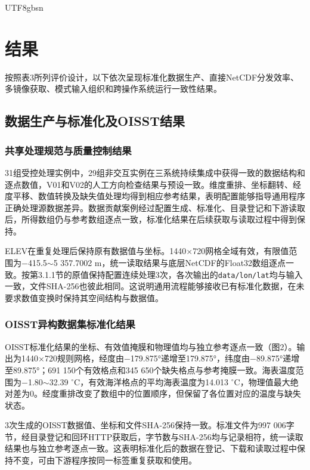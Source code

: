 \documentclass[numdoi]{chinese}
\begin{document}
\begin{CJK}{UTF8}{gbsn}
\section{结果}
按照表3所列评价设计，以下依次呈现标准化数据生产、直接NetCDF分发效率、多镜像获取、模式输入组织和跨操作系统运行一致性结果。

\subsection{数据生产与标准化及OISST结果}
\subsubsection{共享处理规范与质量控制结果}
31组受控处理实例中，29组非交互实例在三系统持续集成中获得一致的数据结构和逐点数值，V01和V02的人工方向检查结果与预设一致。维度重排、坐标翻转、经度平移、数值转换及缺失值处理均得到相应参考结果，表明配置能够指导通用程序正确处理源数据差异。数据贡献案例经过配置生成、标准化、目录登记和下游读取后，所得数组仍与参考数组逐点一致，标准化结果在后续获取与读取过程中得到保持。

ELEV在重复处理后保持原有数据值与坐标。1440\ensuremath{\times}720网格全域有效，有限值范围为\ensuremath{-}415.5\ensuremath{\sim}5 357.7002 m，统一读取结果与底层NetCDF的Float32数组逐点一致。按第3.1.1节的原值保持配置连续处理3次，各次输出的\nolinkurl{data/lon/lat}均与输入一致，文件SHA-256也彼此相同。这说明通用流程能够接收已有标准化数据，在未要求数值变换时保持其空间结构与数据值。

\subsubsection{OISST异构数据集标准化结果}
OISST标准化结果的坐标、有效值掩膜和物理值均与独立参考逐点一致（图2）。输出为1440\ensuremath{\times}720规则网格，经度由\ensuremath{-}179.875°递增至179.875°，纬度由\ensuremath{-}89.875°递增至89.875°；691 150个有效格点和345 650个缺失格点与参考掩膜一致。海表温度范围为\ensuremath{-}1.80\ensuremath{\sim}32.39 \ensuremath{{}^{\circ}\mathrm{C}}，有效海洋格点的平均海表温度为14.013 \ensuremath{{}^{\circ}\mathrm{C}}，物理值最大绝对差为0。经度重排改变了数组中的位置顺序，但保留了各位置对应的温度与缺失状态。

3次生成的OISST数据值、坐标和文件SHA-256保持一致。标准文件为997 006字节，经目录登记和回环HTTP获取后，字节数与SHA-256均与记录相符，统一读取结果也与独立参考逐点一致。这表明标准化后的数据在登记、下载和读取过程中保持不变，可由下游程序按同一标签重复获取和使用。


\end{CJK}
\end{document}
